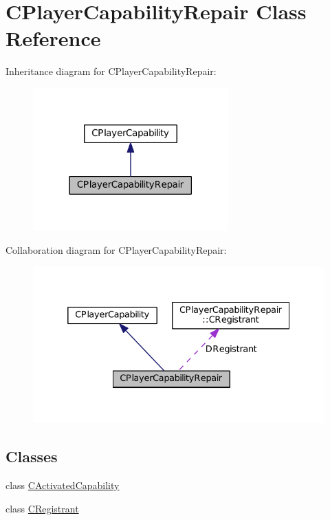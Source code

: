\hypertarget{classCPlayerCapabilityRepair}{}\section{C\+Player\+Capability\+Repair Class Reference}
\label{classCPlayerCapabilityRepair}


Inheritance diagram for C\+Player\+Capability\+Repair\+:
\nopagebreak
\begin{figure}[H]
\begin{center}
\leavevmode
\includegraphics[width=213pt]{classCPlayerCapabilityRepair__inherit__graph}
\end{center}
\end{figure}


Collaboration diagram for C\+Player\+Capability\+Repair\+:
\nopagebreak
\begin{figure}[H]
\begin{center}
\leavevmode
\includegraphics[width=332pt]{classCPlayerCapabilityRepair__coll__graph}
\end{center}
\end{figure}
\subsection*{Classes}
\begin{DoxyCompactItemize}
\item 
class \hyperlink{classCPlayerCapabilityRepair_1_1CActivatedCapability}{C\+Activated\+Capability}
\item 
class \hyperlink{classCPlayerCapabilityRepair_1_1CRegistrant}{C\+Registrant}
\end{DoxyCompactItemize}
